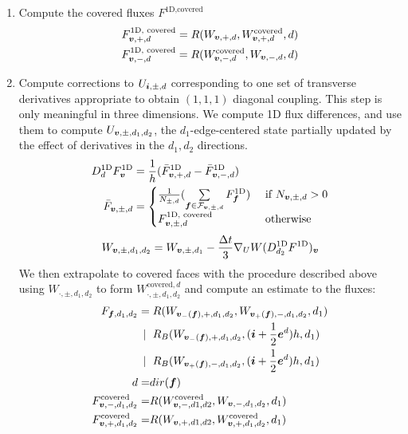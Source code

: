 \begin{enumerate}
\item Compute the covered fluxes $F^{\text{1D}, \text{covered}}$
\begin{equation}
\begin{split}
F^{\text{1D, covered}}_{{\boldsymbol{v}}, +, d} = R(W_{{\boldsymbol{v}}, +, d},
W^{\text{covered}}_{{\boldsymbol{v}}, +, d}, d) \\
F^{\text{1D, covered}}_{{\boldsymbol{v}}, -, d} = R(W^{\text{covered}}_{{\boldsymbol{v}}, -, d},
W_{{\boldsymbol{v}}, -, d}, d)
\end{split}
\label{eqn::coveredflux}
\end{equation}

\item Compute corrections to $U_{{\boldsymbol{i}}, \pm, d}$ corresponding to one
set of transverse derivatives appropriate to obtain $(1, 1, 1)$
diagonal coupling.  This step is only meaningful in three dimensions.
We compute 1D flux differences, and use them to compute
$U_{{\boldsymbol{v}}, \pm, d_1, d_2}$, the $d_1$-edge-centered state partially
updated by the effect of derivatives in the $d_1, d_2$ directions.
\begin{equation}
\begin{split}
D^{\text{1D}}_d F^{\text{1D}}_{\boldsymbol{v}} &= 
\frac{1}{h}(\bar{F}^{\text{1D}}_{{\boldsymbol{v}},+,d} -
\bar{F}^{\text{1D}}_{{\boldsymbol{v}},-,d}) \\
\bar{F}_{{\boldsymbol{v}},\pm,d} &=  
\begin{cases} 
\frac{1}{N_{\pm,d}}
(\sum\limits_{{\boldsymbol{f}} \in \mathcal{F}_{{\boldsymbol{v}}, \pm, d}}
F^{\text{1D}}_{\boldsymbol{f}})
&\mbox{ if } N_{{\boldsymbol{v}}, \pm, d} > 0 
\\
F^{\text{1D, covered}}_{{\boldsymbol{v}}, \pm, d} & \text{ otherwise} 
\end{cases}
\end{split}
\end{equation}
\begin{gather}
W_{{\boldsymbol{v}}, \pm, d_1, d_2} = W_{{\boldsymbol{v}}, \pm, d_1} - \frac{\Delta t}{3}
\nabla_U W (D^{\text{1D}}_{d_2} F^{\text{1D}})_{\boldsymbol{v}} 
\end{gather}
We then extrapolate to covered faces with the procedure described above using 
$W_{\cdot, \pm, d_1, d_2}$ to form $W^{\text{covered},d}_{\cdot, \pm, d_1, d_2}$
and compute an estimate to the fluxes:
\begin{align}
\begin{split}
F_{{\boldsymbol{f}},d_1,d_2} = 
   & \; R(   W_{{\boldsymbol{v}}_{-} ({\boldsymbol{f}}), +, d_1, d_2},
   W_{{\boldsymbol{v}}_{+}({\boldsymbol{f}}),-, d_1, d_2}, d_1) \\
~ | ~&\; R_B(W_{{\boldsymbol{v}}_{-} ({\boldsymbol{f}}), +, d_1, d_2},({\boldsymbol{i}} + \frac{1}{2}
   {\boldsymbol{e}}^d)h, d_1) \\
~ | ~&\; R_B(W_{{\boldsymbol{v}}_{+} ({\boldsymbol{f}}), -, d_1, d_2},({\boldsymbol{i}} + \frac{1}{2}
   {\boldsymbol{e}}^d)h, d_1) \\
d =& dir({\boldsymbol{f}}) \\
F^{\text{covered}}_{{\boldsymbol{v}}, -, d_1, d_2} = &
 R(W^{\text{covered}}_{{\boldsymbol{v}}, -, d1, d2}, W_{{\boldsymbol{v}}, -, d_1, d_2},
 d_1) \\
F^{\text{covered}}_{{\boldsymbol{v}}, +, d_1, d_2} = &
 R(W_{{\boldsymbol{v}}, +, d1, d2}, W^{\text{covered}}_{{\boldsymbol{v}}, +, d_1, d_2}, d_1)
\end{split}
\end{align}


\end{enumerate}

